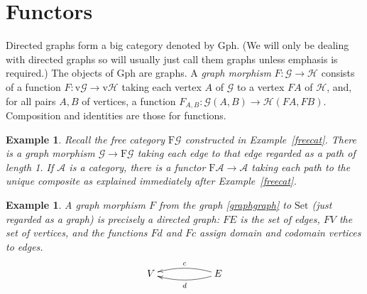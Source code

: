 \documentclass[a4paper,12pt]{article}
\newtheorem{example}[theorem]{Example}
\theoremstyle{step}
\def\CA{{\mathscr A}}
\def\CG{{\mathscr G}}
\def\CH{{\mathscr H}}
\begin{document}
\section{Functors}\label{Fun}
Directed graphs form a big category denoted by $\mathrm{Gph}$.
(We will only be dealing with directed graphs so will usually just call them graphs unless emphasis is required.) 
The objects of $\mathrm{Gph}$ are graphs.
A {\em graph morphism} $F : \CG \to \CH$ consists of a function 
$F : \mathrm{v}\CG \to \mathrm{v}\CH$ taking each vertex $A$ of $\CG$ to a vertex $FA$ of 
$\CH$, and, for all pairs $A,B$ of vertices, a function $F_{A,B} : \CG(A,B)\to \CH(FA, FB)$.
Composition and identities are those for functions.
\begin{example}\label{inclgenerators} Recall the free category $\mathrm{F}\CG$ constructed in Example~\ref{freecat}. There is a graph morphism $\CG\to \mathrm{F}\CG$ taking each edge to that edge regarded as a path of length 1. If $\CA$ is a category, there is a functor $\mathrm{F}\CA\to \CA$
taking each path to the unique composite as explained immediately after Example~\ref{freecat}. 
\end{example} 
\begin{example} A graph morphism $F$ from the graph \eqref{graphgraph} to $\mathrm{Set}$
(just regarded as a graph) is precisely a directed graph: $FE$ is the set of edges, $FV$ the set of
vertices, and the functions $Fd$ and $Fc$ assign domain and codomain vertices to edges.  
\begin{eqnarray}\label{graphgraph}
\begin{aligned}
\xymatrix{
V
&& E \ar@/^/[ll] ^ {d} \ar@/_/[ll] _ {c}
}
\end{aligned}
\end{eqnarray}
\end{example}
\end{document}

